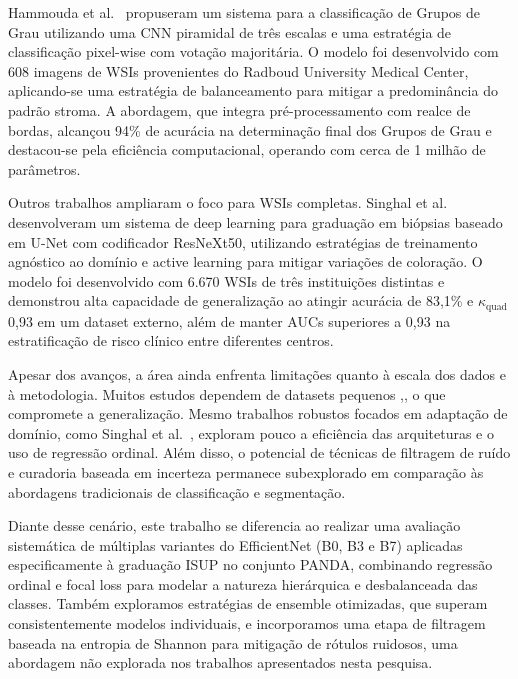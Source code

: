 Hammouda et al.~\cite{ref-hammouda2021} propuseram um sistema  para a classificação de Grupos de Grau utilizando uma CNN piramidal de três escalas e uma estratégia de classificação pixel-wise com votação majoritária. O modelo foi desenvolvido com 608 imagens de WSIs provenientes do Radboud University Medical Center, aplicando-se uma estratégia de balanceamento para mitigar a predominância do padrão stroma. A abordagem, que integra pré-processamento com realce de bordas, alcançou 94\% de acurácia na determinação final dos Grupos de Grau e destacou-se pela eficiência computacional, operando com cerca de 1 milhão de parâmetros.

Outros trabalhos ampliaram o foco para WSIs completas. 
Singhal et al.~\cite{ref-singhal2022} desenvolveram um sistema de deep learning para graduação em biópsias baseado em U-Net com codificador ResNeXt50, utilizando estratégias de treinamento agnóstico ao domínio e active learning para mitigar variações de coloração. O modelo foi desenvolvido com 6.670 WSIs de três instituições distintas e demonstrou alta capacidade de generalização ao atingir acurácia de 83,1\% e $\kappa_{\text{quad}}$ 0,93 em um dataset externo, além de manter AUCs superiores a 0,93 na estratificação de risco clínico entre diferentes centros.

Apesar dos avanços, a área ainda enfrenta limitações quanto à escala dos dados e à metodologia. Muitos estudos dependem de datasets pequenos \cite{ref-kott2019},\cite{ref-lucas2019}, o que compromete a generalização. Mesmo trabalhos robustos focados em adaptação de domínio, como Singhal et al.~\cite{ref-singhal2022}, exploram pouco a eficiência das arquiteturas e o uso de regressão ordinal. Além disso, o potencial de técnicas de filtragem de ruído e curadoria baseada em incerteza permanece subexplorado em comparação às abordagens tradicionais de classificação e segmentação.

Diante desse cenário, este trabalho se diferencia ao realizar uma avaliação sistemática de múltiplas variantes do EfficientNet (B0, B3 e B7) aplicadas especificamente à graduação ISUP no conjunto PANDA, combinando regressão ordinal e focal loss para modelar a natureza hierárquica e desbalanceada das classes. Também exploramos estratégias de ensemble otimizadas, que superam consistentemente modelos individuais, e incorporamos uma etapa de filtragem baseada na entropia de Shannon para mitigação de rótulos ruidosos, uma abordagem não explorada nos trabalhos apresentados nesta pesquisa.